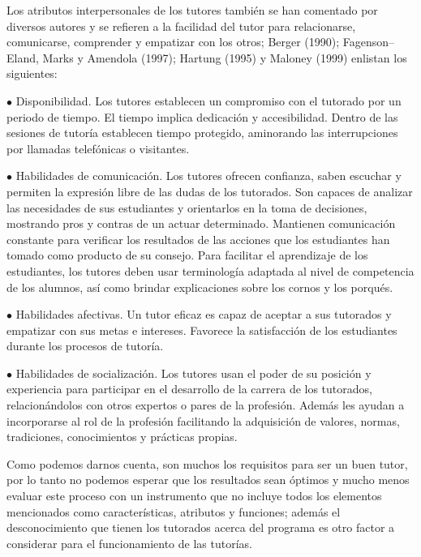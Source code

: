 Los atributos interpersonales de los tutores también se han comentado por
diversos autores y se refieren a la facilidad del tutor para relacionarse,
comunicarse, comprender y empatizar con los otros; Berger (1990);
Fagenson–Eland, Marks y Amendola (1997); Hartung (1995) y Maloney (1999)
enlistan los siguientes:


\begin{Obs}
\item[$\bullet$] Disponibilidad. Los tutores establecen un compromiso con el tutorado por
un periodo de tiempo. El tiempo implica dedicación y accesibilidad. Dentro
de las sesiones de tutoría establecen tiempo protegido, aminorando las
interrupciones por llamadas telefónicas o visitantes.
\item[$\bullet$] Habilidades de comunicación. Los tutores ofrecen confianza, saben escuchar
y permiten la expresión libre de las dudas de los tutorados. Son capaces de
analizar las necesidades de sus estudiantes y orientarlos en la toma de
decisiones, mostrando pros y contras de un actuar determinado. Mantienen
comunicación constante para verificar los resultados de las acciones que
los estudiantes han tomado como producto de su consejo. Para facilitar el
aprendizaje de los estudiantes, los tutores deben usar terminología
adaptada al nivel de competencia de los alumnos, así como brindar
explicaciones sobre los cornos y los porqués.
\item[$\bullet$] Habilidades afectivas. Un tutor eficaz es capaz de aceptar a sus tutorados
y empatizar con sus metas e intereses. Favorece la satisfacción de los
estudiantes durante los procesos de tutoría.
\item[$\bullet$] Habilidades de socialización. Los tutores usan el poder de su posición y
experiencia para participar en el desarrollo de la carrera de los
tutorados, relacionándolos con otros expertos o pares de la profesión.
Además les ayudan a incorporarse al rol de la profesión facilitando la
adquisición de valores, normas, tradiciones, conocimientos y prácticas
propias.
\end{Obs}

\medskip
Como podemos darnos cuenta, son muchos los requisitos para ser un buen
tutor, por lo tanto no podemos esperar que los resultados sean óptimos y
mucho menos evaluar este proceso con un instrumento que no incluye todos
los elementos mencionados como características, atributos y funciones;
además el desconocimiento que tienen los tutorados acerca del programa es
otro factor a considerar para el funcionamiento de las tutorías.

